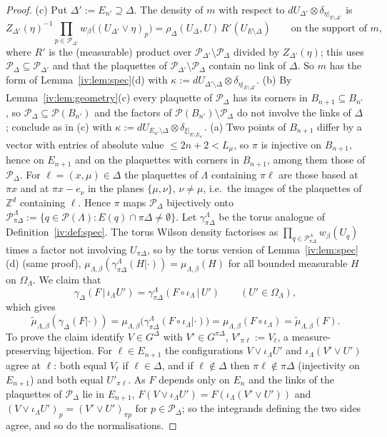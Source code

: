 \documentclass[11pt,a4paper]{article}
\theoremstyle{definition}
\theoremstyle{remark}
\newcommand{\Z}{\mathbb{Z}}
\newcommand{\cP}{\mathcal{P}}
\begin{document}
\begin{proof}
(c) Put $\Delta':=E_{n'}\supseteq\Delta$. The density of $m$ with respect to $dU_{\Delta'}\otimes\delta_{\eta|_{E\setminus\Delta'}}$
is
\[
Z_{\Delta'}(\eta)^{-1}\prod_{p\in\cP_{\Delta'}}w_\beta\bigl((U_{\Delta'}\vee\eta)_p\bigr)
=\rho_\Delta(U_\Delta,U)\,R'(U_{E\setminus\Delta})\qquad\text{on the support of }m,
\]
where $R'$ is the (measurable) product over $\cP_{\Delta'}\setminus\cP_\Delta$ divided by $Z_{\Delta'}(\eta)$; this uses
$\cP_\Delta\subseteq\cP_{\Delta'}$ and that the plaquettes of $\cP_{\Delta'}\setminus\cP_\Delta$ contain no link of $\Delta$. So $m$ has
the form of Lemma~\ref{iv:lem:spec}(d) with $\kappa:=dU_{\Delta'\setminus\Delta}\otimes\delta_{\eta|_{E\setminus\Delta'}}$.
(b) By Lemma~\ref{iv:lem:geometry}(c) every plaquette of $\cP_\Delta$ has its corners in $B_{n+1}\subseteq B_{n'}$, so
$\cP_\Delta\subseteq\cP(B_{n'})$ and the factors of $\cP(B_{n'})\setminus\cP_\Delta$ do not involve the links of $\Delta$; conclude
as in (c) with $\kappa:=dU_{E_{n'}\setminus\Delta}\otimes\delta_{\xi|_{E\setminus E_{n'}}}$.
(a) Two points of $B_{n+1}$ differ by a vector with entries of absolute value $\le2n+2<L_\mu$, so $\pi$ is injective on
$B_{n+1}$, hence on $E_{n+1}$ and on the plaquettes with corners in $B_{n+1}$, among them those of $\cP_\Delta$. For
$\ell=(x,\mu)\in\Delta$ the plaquettes of $\Lambda$ containing $\pi\ell$ are those based at $\pi x$ and at $\pi x-e_\nu$ in the planes
$\{\mu,\nu\}$, $\nu\neq\mu$, i.e.\ the images of the plaquettes of $\Z^d$ containing $\ell$. Hence $\pi$ maps $\cP_\Delta$
bijectively onto $\cP^\Lambda_{\pi\Delta}:=\{q\in\cP(\Lambda):E(q)\cap\pi\Delta\ne\emptyset\}$. Let $\gamma^\Lambda_{\pi\Delta}$ be the
torus analogue of Definition~\ref{iv:def:spec}. The torus Wilson density factorises as
$\prod_{q\in\cP^\Lambda_{\pi\Delta}}w_\beta(U_q)$ times a factor not involving $U_{\pi\Delta}$, so by the torus version of
Lemma~\ref{iv:lem:spec}(d) (same proof), $\mu_{\Lambda,\beta}(\gamma^\Lambda_{\pi\Delta}(H|\cdot))=\mu_{\Lambda,\beta}(H)$ for all bounded
measurable $H$ on $\Omega_\Lambda$. We claim that
\[
\gamma_\Delta(F\,|\,\iota_\Lambda U')=\gamma^\Lambda_{\pi\Delta}(F\circ\iota_\Lambda\,|\,U')\qquad(U'\in\Omega_\Lambda),
\]
which gives
\[
\tilde\mu_{\Lambda,\beta}(\gamma_\Delta(F|\cdot))=\mu_{\Lambda,\beta}\bigl(\gamma^\Lambda_{\pi\Delta}(F\circ\iota_\Lambda|\cdot)\bigr)
=\mu_{\Lambda,\beta}(F\circ\iota_\Lambda)=\tilde\mu_{\Lambda,\beta}(F).
\]
To prove the claim identify $V\in G^\Delta$ with $V'\in G^{\pi\Delta}$,
$V'_{\pi\ell}:=V_\ell$, a measure-preserving bijection. For $\ell\in E_{n+1}$ the configurations $V\vee\iota_\Lambda U'$ and
$\iota_\Lambda(V'\vee U')$ agree at $\ell$: both equal $V_\ell$ if $\ell\in\Delta$, and if $\ell\notin\Delta$ then $\pi\ell\notin\pi\Delta$
(injectivity on $E_{n+1}$) and both equal $U'_{\pi\ell}$. As $F$ depends only on $E_n$ and the links of the plaquettes of
$\cP_\Delta$ lie in $E_{n+1}$, $F(V\vee\iota_\Lambda U')=F(\iota_\Lambda(V'\vee U'))$ and $(V\vee\iota_\Lambda U')_p=(V'\vee U')_{\pi p}$
for $p\in\cP_\Delta$; so the integrands defining the two sides agree, and so do the normalisations.
\end{proof}
\end{document}
